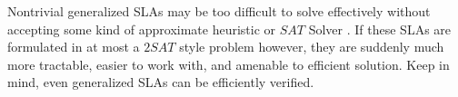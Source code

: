Nontrivial generalized SLAs may be too difficult to solve effectively without accepting some kind of approximate heuristic or $ SAT $ Solver \cite{Hochbaum:1996:AAN:241938,ctrl:satcompetition}.  If these SLAs are formulated in at most a $ 2SAT $ style problem however, they are suddenly much more tractable, easier to work with, and amenable to efficient solution.  Keep in mind, even generalized SLAs can be efficiently verified.
